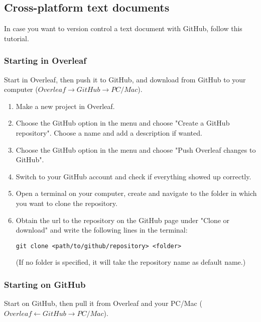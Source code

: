 \documentclass{article}
\begin{document}
\subsection{Cross-platform text documents}
In case you want to version control a text document with GitHub, follow this tutorial.

\subsubsection{Starting in Overleaf}
Start in Overleaf, then push it to GitHub, and download from GitHub to your computer
($Overleaf \rightarrow GitHub \rightarrow PC/Mac$).

\begin{enumerate}
    \item Make a new project in Overleaf.
    \item Choose the GitHub option in the menu and choose "Create a GitHub repository". Choose a name and add a description if wanted.
    \item Choose the GitHub option in the menu and choose "Push Overleaf changes to GitHub".
    \item Switch to your GitHub account and check if everything showed up correctly.
    \item Open a terminal on your computer, create and navigate to the folder in which you want to clone the repository.
    \item Obtain the url to the repository on the GitHub page under "Clone or download" and write the following lines in the terminal: 
    \begin{verbatim}
git clone <path/to/github/repository> <folder>
    \end{verbatim}
    (If no folder is specified, it will take the repository name as default name.)
\end{enumerate}

\subsubsection{Starting on GitHub}
Start on GitHub, then pull it from Overleaf and your PC/Mac
($Overleaf \leftarrow GitHub \rightarrow PC/Mac$).
\end{document}
